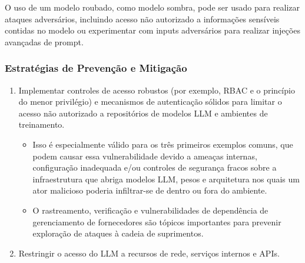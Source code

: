 \documentclass[
]{article}
\providecommand{\tightlist}{%
  \setlength{\itemsep}{0pt}\setlength{\parskip}{0pt}}
\begin{document}
O uso de um modelo roubado, como modelo sombra, pode ser usado para
realizar ataques adversários, incluindo acesso não autorizado a
informações sensíveis contidas no modelo ou experimentar com inputs
adversários para realizar injeções avançadas de prompt.

\subsubsection{Estratégias de Prevenção e
Mitigação}\label{estratuxe9gias-de-prevenuxe7uxe3o-e-mitigauxe7uxe3o}

\begin{enumerate}
\def\labelenumi{\arabic{enumi}.}
\tightlist
\item
  Implementar controles de acesso robustos (por exemplo, RBAC e o
  princípio do menor privilégio) e mecanismos de autenticação sólidos
  para limitar o acesso não autorizado a repositórios de modelos LLM e
  ambientes de treinamento.

  \begin{itemize}
  \tightlist
  \item
    Isso é especialmente válido para os três primeiros exemplos comuns,
    que podem causar essa vulnerabilidade devido a ameaças internas,
    configuração inadequada e/ou controles de segurança fracos sobre a
    infraestrutura que abriga modelos LLM, pesos e arquitetura nos quais
    um ator malicioso poderia infiltrar-se de dentro ou fora do
    ambiente.
  \item
    O rastreamento, verificação e vulnerabilidades de dependência de
    gerenciamento de fornecedores são tópicos importantes para prevenir
    exploração de ataques à cadeia de suprimentos.
  \end{itemize}
\item
  Restringir o acesso do LLM a recursos de rede, serviços internos e
  APIs.


\end{enumerate}
\end{document}
